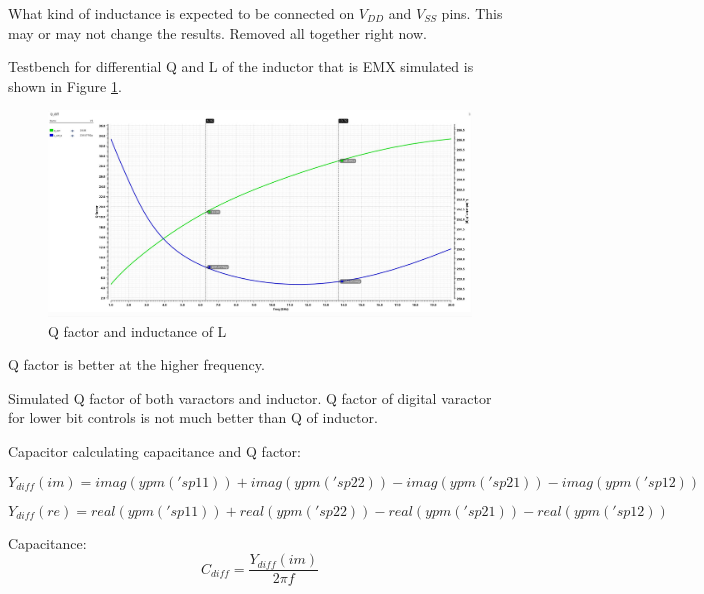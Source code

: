 \documentclass{article}
\begin{document}

\begin{question}
	What kind of inductance is expected to be connected on $V_{DD}$ and $V_{SS}$ pins. This may or may not change the results. Removed all together right now.
\end{question}

Testbench for differential Q and L of the inductor that is EMX simulated is shown in Figure \ref{fig:qlinductor}.

\begin{figure}[ht!]
	\includegraphics[width=\linewidth]{Figures/QL_inductor.png}
	\caption{Q factor and inductance of L}
	\label{fig:qlinductor}
\end{figure}

Q factor is better at the higher frequency.

Simulated Q factor of both varactors and inductor. Q factor of digital varactor for lower bit controls is not much better than Q of inductor.

Capacitor calculating capacitance and Q factor:

\begin{equation}
	Y_{diff} (im) = imag(ypm('sp 1 1)) + imag(ypm('sp 2 2)) - imag(ypm('sp 2 1)) - imag(ypm('sp 1 2))
\end{equation}

\begin{equation}
	Y_{diff} (re) = real(ypm('sp 1 1)) + real(ypm('sp 2 2)) - real(ypm('sp 2 1)) - real(ypm('sp 1 2))
\end{equation}

Capacitance:
\begin{equation}
	C_{diff} = \dfrac{Y_{diff} (im)}{2\pi f}
\end{equation}
\end{document}
